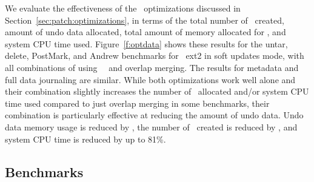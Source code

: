 \opttable{}

We evaluate the effectiveness of the \patch\ optimizations discussed in
Section~\ref{sec:patch:optimizations}, in terms of
%
the total number of \patches\ created, amount of undo data allocated,
total amount of memory allocated for \Kudos, and system CPU time used.
%
Figure~\ref{f:optdata} shows these results for the untar, delete,
PostMark, and Andrew benchmarks for \Kudos\ ext2 in soft updates mode,
with all combinations of using \nrb\ \patches\ and overlap merging.
The results for metadata and full data journaling are similar.
%
While both optimizations work well alone and their combination
slightly increases the number of \patches\ allocated and/or system CPU
time used compared to just overlap merging in some benchmarks, their
combination is particularly effective at reducing the amount of undo
data.
%
Undo data memory usage is reduced by \patchoptundo,
%
the number of \patches\ created is reduced by \patchoptcount,
%
and system CPU time is reduced by up to 81\%.

\begin{comment}
\begin{figure}[t]
\vspace{-0.5\baselineskip}
\centering{
\texttt{[image: rb\_patch\_size]}
}
\vspace{-0.5\baselineskip}
\caption{\label{fig:patchsize-histo} \Rb\ \patch\ size histogram for a sample
workload (extracting a large archive into ext2). All the \patches\ larger than
63 bytes have been optimized into \nrb\ \patches. \Rb\ \patches\ 4 bytes and
smaller account for about 51\% of all \rb\ \patches.}
\end{figure}
\end{comment}

\subsection {Benchmarks}
\label{sec:eval:bench}

\newcommand{\safe}[1]{\textbf{#1}}
\newcommand{\unsafe}[1]{#1}

